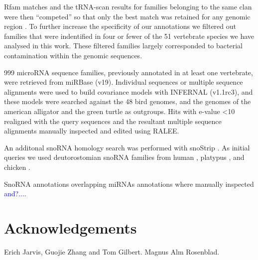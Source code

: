 \documentclass[10pt]{bmc_article}
\newcommand {\ppg}[1]{\textcolor{blue}{#1}}
\newenvironment{bmcformat}{\begin{raggedright}\baselineskip20pt\sloppy\setboolean{publ}{false}}{\end{raggedright}\baselineskip20pt\sloppy}
\begin{document}
\begin{bmcformat}
Rfam matches and the tRNA-scan results for families belonging to the
same clan were then ``competed'' so that only the best match was
retained for any genomic region \cite{Gardner:2011a}.  To further
increase the specificity of our annotations we filtered out families
that were indentified in four or fewer of the 51 vertebrate species we
have analysed in this work. These filtered families largely
corresponded to bacterial contamination within the genomic sequences.

999 microRNA sequence families, previously annotated in at least one
vertebrate, were retrieved from miRBase (v19). Individual sequences or
multiple sequence alignments were used to build covariance models with
INFERNAL (v1.1rc3), and these models were searched against the 48 bird
genomes, and the genomes of the american alligator and the green
turtle as outgroups. Hits with e-value <10 realigned with the query
sequences and the resultant multiple sequence alignments manually
inspected and edited using RALEE.

An additonal snoRNA homology search was performed with snoStrip
\cite{Bartschat:2013}. As initial queries we used deutorostomian
snoRNA families from human \cite{Lestrade:2006}, platypus
\cite{Schmitz:2008}, and chicken \cite{Shao:2009}.

SnoRNA annotations overlapping miRNAs annotations where manually
inspected \ppg{and?...}.




\section*{Acknowledgements}

Erich Jarvis, Guojie Zhang and Tom Gilbert. Magnus Alm Rosenblad. 


{
  } %


\clearpage
\newpage



\end{bmcformat}
\end{document}
